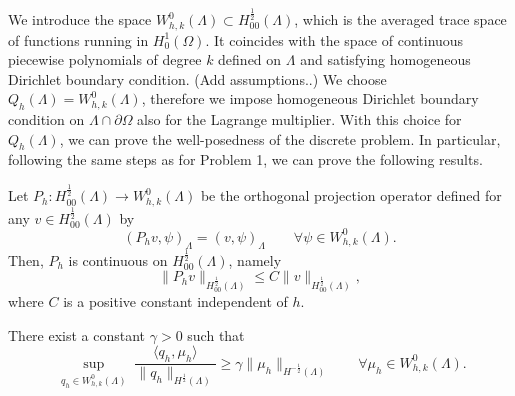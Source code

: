 We introduce the space
$W_{h,k}^0(\Lambda) \subset H^{\frac 12} _{00} (\Lambda)$, which is the averaged trace space of functions running in $H^1_0(\Omega)$. It coincides with the space of continuous piecewise polynomials of degree $k$ defined on $\Lambda$ and satisfying homogeneous Dirichlet boundary condition. {\color{red} (Add assumptions..)}
We choose $Q_h(\Lambda)=W_{h,k}^0(\Lambda)$, therefore we impose homogeneous Dirichlet boundary condition on $\Lambda \cap \partial \Omega$ also for the Lagrange multiplier. With this choice for $Q_h(\Lambda)$, we can prove the well-posedness of the discrete problem. In particular, following the same steps as for Problem 1, we can prove the following results.
\begin{lemma}
Let $P_h: H^{\frac 12}_{00}(\Lambda) \longrightarrow W_{h,k}^0(\Lambda)$ be the orthogonal projection operator defined  for any $v \in H^{\frac 12}_{00}(\Lambda)$ by
\begin{equation*}
(P_h v , \psi)_\Lambda= (v, \psi)_\Lambda \qquad \forall \psi \in W_{h,k}^0(\Lambda).  
\end{equation*} 
Then, $P_h$ is continuous on $H^{\frac 12}_{00}(\Lambda)$, namely
\begin{equation*}
\|P_h v\|_{H^{\frac 12}_{00}(\Lambda)} \leq C \|v\|_{H^{\frac 12}_{00}(\Lambda)},
\end{equation*}
where $C$ is a positive constant independent of $h$.
\end{lemma}

\begin{lemma}\label{infsup_avr_trspace}
There exist a constant $\gamma >0$ such that
\begin{equation*}
\sup_{\substack{q_h \in W_{h,k}^0(\Lambda)}} \frac{\langle q_h , \mu_h \rangle}{ \|q_h\|_{H^{\frac 12}(\Lambda)}} \geq \gamma \|\mu_h\|_{H^{-\frac 12}(\Lambda)} \qquad \forall \mu_h \in W_{h,k}^0(\Lambda).
\end{equation*} 
\end{lemma}

